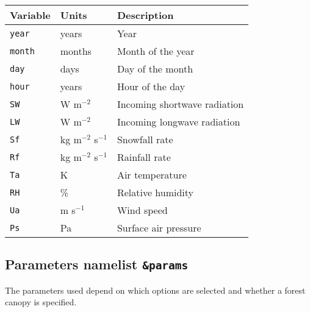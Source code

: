 \documentclass{article}
\begin{document}
\begin{tabular}{|l|l|l|}
\hline
Variable & Units & Description  \\
\hline
{\tt year}  & years    & Year                         \\
{\tt month} & months   & Month of the year            \\
{\tt day}   & days     & Day of the month             \\
{\tt hour}  & years    & Hour of the day              \\
{\tt SW} & W m$^{-2}$  & Incoming shortwave radiation \\
{\tt LW} & W m$^{-2}$  & Incoming longwave radiation  \\
{\tt Sf} & kg m$^{-2}$ s$^{-1}$ & Snowfall rate       \\
{\tt Rf} & kg m$^{-2}$ s$^{-1}$ & Rainfall rate       \\
{\tt Ta} & K           & Air temperature              \\
{\tt RH} & \%          & Relative humidity            \\
{\tt Ua} & m s$^{-1}$  & Wind speed                   \\
{\tt Ps} & Pa          & Surface air pressure         \\
\hline 
\end{tabular}

\subsection*{Parameters namelist {\tt \&params}}

The parameters used depend on which options are selected and whether a forest canopy is specified.
\end{document}
